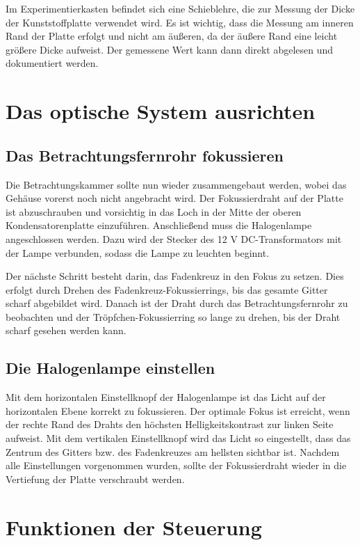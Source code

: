 Im Experimentierkasten befindet sich eine Schieblehre, die zur Messung der Dicke der Kunststoffplatte verwendet wird. Es ist wichtig, dass die Messung am inneren Rand der Platte erfolgt und nicht am äußeren, da der äußere Rand eine leicht größere Dicke aufweist. Der gemessene Wert kann dann direkt abgelesen und dokumentiert werden.

\section{Das optische System ausrichten}\label{sec:optischesSystem}
\subsection{Das Betrachtungsfernrohr fokussieren}
Die Betrachtungskammer sollte nun wieder zusammengebaut werden, wobei das Gehäuse vorerst noch nicht angebracht wird. Der Fokussierdraht auf der Platte ist abzuschrauben und vorsichtig in das Loch in der Mitte der oberen Kondensatorenplatte einzuführen. Anschließend muss die Halogenlampe angeschlossen werden. Dazu wird der Stecker des 12 V DC-Transformators mit der Lampe verbunden, sodass die Lampe zu leuchten beginnt.

Der nächste Schritt besteht darin, das Fadenkreuz in den Fokus zu setzen. Dies erfolgt durch Drehen des Fadenkreuz-Fokussierrings, bis das gesamte Gitter scharf abgebildet wird. Danach ist der Draht durch das Betrachtungsfernrohr zu beobachten und der Tröpfchen-Fokussierring so lange zu drehen, bis der Draht scharf gesehen werden kann.

\subsection{Die Halogenlampe einstellen}\label{sub:Halogenlampe}
Mit dem horizontalen Einstellknopf der Halogenlampe ist das Licht auf der horizontalen Ebene korrekt zu fokussieren. Der optimale Fokus ist erreicht, wenn der rechte Rand des Drahts den höchsten Helligkeitskontrast zur linken Seite aufweist. Mit dem vertikalen Einstellknopf wird das Licht so eingestellt, dass das Zentrum des Gitters bzw. des Fadenkreuzes am hellsten sichtbar ist. Nachdem alle Einstellungen vorgenommen wurden, sollte der Fokussierdraht wieder in die Vertiefung der Platte verschraubt werden.

\section{Funktionen der Steuerung}\label{sec:funktionen}

